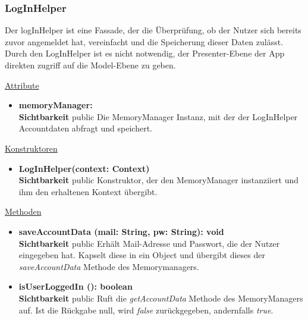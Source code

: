 \subsubsection{LogInHelper} \label{app:klasse:LogInHelper}
Der logInHelper ist eine Fassade, der die Überprüfung, ob der Nutzer sich bereits zuvor angemeldet hat, vereinfacht und die Speicherung dieser Daten zulässt. Durch den LogInHelper ist es nicht notwendig, der Presenter-Ebene der App direkten zugriff auf die Model-Ebene zu geben.
\newline

\underline{Attribute}
\begin{itemize}
\itemsep0pt
\item \textbf{memoryManager: } \hfill\\ 
\textbf{Sichtbarkeit} public\newline
Die MemoryManager Instanz, mit der der LogInHelper Accountdaten abfragt und speichert.

\end{itemize}

\underline{Konstruktoren}
\begin{itemize}
\itemsep0pt
\item \textbf{LogInHelper(context: Context)} \hfill\\
\textbf{Sichtbarkeit} public\newline
Konstruktor, der den MemoryManager instanziiert und ihm den erhaltenen Kontext übergibt. 
\end{itemize}

\underline{Methoden}
\begin{itemize}
\itemsep0pt
\item \textbf{saveAccountData (mail: String, pw: String): void}\hfill\\
\textbf{Sichtbarkeit} public\newline
Erhält Mail-Adresse und Passwort, die der Nutzer eingegeben hat. Kapselt diese in ein  Object und übergibt dieses der \textit{saveAccountData} Methode des Memorymanagers.

\item \textbf{isUserLoggedIn (): boolean}\hfill\\
\textbf{Sichtbarkeit} public\newline
Ruft die \textit{getAccountData} Methode des MemoryManagers auf. Ist die Rückgabe null, wird \textit{false} zurückgegeben, andernfalls \textit{true}.

\end{itemize}